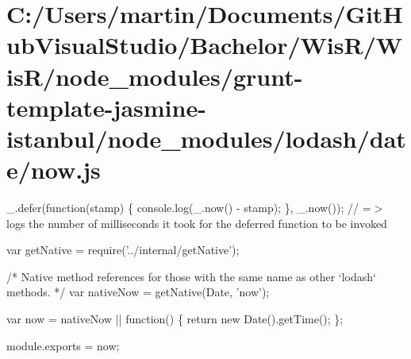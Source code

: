 \hypertarget{_c_1_2_users_2martin_2_documents_2_git_hub_visual_studio_2_bachelor_2_wis_r_2_wis_r_2node_module14b0805c28cce7edfb50c37085f460e0}{}\section{C\+:/\+Users/martin/\+Documents/\+Git\+Hub\+Visual\+Studio/\+Bachelor/\+Wis\+R/\+Wis\+R/node\+\_\+modules/grunt-\/template-\/jasmine-\/istanbul/node\+\_\+modules/lodash/date/now.\+js}
\+\_\+.\+defer(function(stamp) \{ console.\+log(\+\_\+.\+now() -\/ stamp); \}, \+\_\+.\+now()); // =$>$ logs the number of milliseconds it took for the deferred function to be invoked


\begin{DoxyCodeInclude}
var getNative = require(\textcolor{stringliteral}{'../internal/getNative'});

\textcolor{comment}{/* Native method references for those with the same name as other `lodash` methods. */}
var nativeNow = getNative(Date, \textcolor{stringliteral}{'now'});

var now = nativeNow || \textcolor{keyword}{function}() \{
  \textcolor{keywordflow}{return} \textcolor{keyword}{new} Date().getTime();
\};

module.exports = now;
\end{DoxyCodeInclude}
 